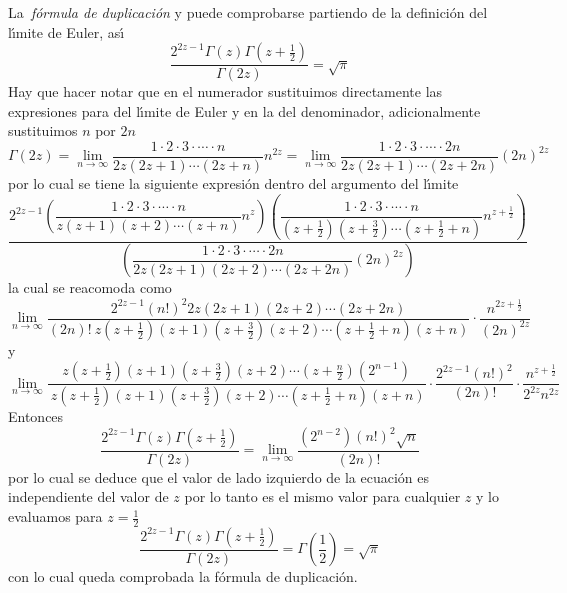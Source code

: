 \documentclass[spanish,notitlepage,letterpaper,12pt]{article}
\begin{document}
La\textit{\ f\'{o}rmula de duplicaci\'{o}n} y puede comprobarse partiendo de
la definici\'{o}n del l\'{\i}mite de Euler, as\'{\i}
\[
\frac{2^{2z-1}\Gamma\left(  z\right)  \Gamma\left(  z+\frac12\right)  }%
{\Gamma\left(  2z\right)  }=\sqrt{\pi}
\]
Hay que hacer notar que en el numerador sustituimos directamente las
expresiones para del l\'{\i}mite de Euler y en la del denominador,
adicionalmente sustituimos $n$ por $2n$
\[
\Gamma\left(  2z\right)  =\lim_{n\rightarrow\infty}\frac{1\cdot2\cdot
3\cdot\cdots\cdot n}{2z\left(  2z+1\right)  \cdots\left(  2z+n\right)  }%
n^{2z}=\lim_{n\rightarrow\infty}\frac{1\cdot2\cdot3\cdot\cdots\cdot
2n}{2z\left(  2z+1\right)  \cdots\left(  2z+2n\right)  }\left(  2n\right)
^{2z}
\]
por lo cual se tiene la siguiente expresi\'{o}n dentro del argumento del
l\'{\i}mite
\[
\frac{2^{2z-1}\left(  \dfrac{1\cdot2\cdot3\cdot\cdots\cdot n}{z\left(
z+1\right)  \left(  z+2\right)  \cdots\left(  z+n\right)  }n^{z}\right)
\left(  \dfrac{1\cdot2\cdot3\cdot\cdots\cdot n}{\left(  z+\frac12\right)
\left(  z+\frac32\right)  \cdots\left(  z+\frac12+n\right)  }n^{z+\frac
12}\right)  }{\left(  \dfrac{1\cdot2\cdot3\cdot\cdots\cdot2n}{2z\left(
2z+1\right)  \left(  2z+2\right)  \cdots\left(  2z+2n\right)  }\left(
2n\right)  ^{2z}\right)  }
\]
la cual se reacomoda como
\[
\lim_{n\rightarrow\infty}\frac{2^{2z-1}\left(  n!\right)  ^{2}2z\left(
2z+1\right)  \left(  2z+2\right)  \cdots\left(  2z+2n\right)  }{\left(
2n\right)  !\ z\left(  z+\frac12\right)  \left(  z+1\right)  \left(
z+\frac32\right)  \left(  z+2\right)  \cdots\left(  z+\frac12+n\right)
\left(  z+n\right)  }\cdot\frac{n^{2z+\frac12}}{\left(  2n\right)  ^{2z}}
\]
y
\[
\lim_{n\rightarrow\infty}\frac{z\left(  z+\frac12\right)  \left(  z+1\right)
\left(  z+\frac32\right)  \left(  z+2\right)  \cdots\left(  z+\frac n2\right)
\left(  2^{n-1}\right)  }{\ z\left(  z+\frac12\right)  \left(  z+1\right)
\left(  z+\frac32\right)  \left(  z+2\right)  \cdots\left(  z+\frac
12+n\right)  \left(  z+n\right)  }\cdot\frac{2^{2z-1}\left(  n!\right)  ^{2}%
}{\left(  2n\right)  !}\cdot\frac{n^{z+\frac12}}{2^{2z}n^{2z}}
\]
Entonces
\[
\frac{2^{2z-1}\Gamma\left(  z\right)  \Gamma\left(  z+\frac12\right)  }%
{\Gamma\left(  2z\right)  }=\lim_{n\rightarrow\infty}\frac{\left(
2^{n-2}\right)  \left(  n!\right)  ^{2}\sqrt{n}}{\left(  2n\right)  !}
\]
por lo cual se deduce que el valor de lado izquierdo de la ecuaci\'{o}n es
independiente del valor de $z$ por lo tanto es el mismo valor para cualquier
$z$ y lo evaluamos para $z=\frac12$
\[
\frac{2^{2z-1}\Gamma\left(  z\right)  \Gamma\left(  z+\frac12\right)  }%
{\Gamma\left(  2z\right)  }=\Gamma\left(  \frac12\right)  =\sqrt{\pi}
\]
con lo cual queda comprobada la f\'{o}rmula de duplicaci\'{o}n.
\end{document}
